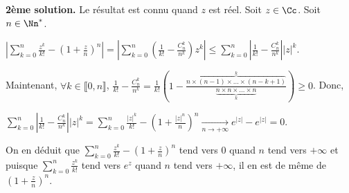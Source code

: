 {{\textbf{2ème solution.} Le résultat est connu quand $z$ est réel. Soit $z\in\Cc$. Soit $n\in\Nn^*$.

\begin{center}
$\left|\sum_{k=0}^{n} \frac{z^k}{k!}-\left(1+ \frac{z}{n}\right)^n\right| =\left|\sum_{k=0}^{n}\left( \frac{1}{k!}- \frac{C_n^k}{n^k}\right)z^k\right|\leqslant\sum_{k=0}^{n}\left| \frac{1}{k!}- \frac{C_n^k}{n^k}\right||z|^k $.
\end{center}

Maintenant, $\forall k\in\llbracket0,n\rrbracket$, $ \frac{1}{k!}- \frac{C_n^k}{n^k}= \frac{1}{k!}\left(1-  \frac{\overbrace{n\times(n-1)\times\ldots\times(n-k+1)}^{k}}{\underbrace{n\times n\times\ldots\times n}_{k}}\right)\geqslant 0$. Donc,

\begin{center}
$\sum_{k=0}^{n}\left| \frac{1}{k!}- \frac{C_n^k}{n^k}\right||z|^k=\sum_{k=0}^{n} \frac{|z|^k}{k!}-\left(1+ \frac{|z|^n}{n}\right)^n\underset{n\rightarrow+\infty}{\rightarrow}e^{|z|}-e^{|z|}= 0$.
\end{center}

On en déduit que $\sum_{k=0}^{n} \frac{z^k}{k!}-\left(1+ \frac{z}{n}\right)^n$ tend vers $0$ quand $n$ tend vers $+\infty$ et puisque $\sum_{k=0}^{n} \frac{z^k}{k!}$ tend vers $e^z$ quand $n$ tend vers $+\infty$, il en est de même de $\left(1+ \frac{z}{n}\right)^n$.
}
}
